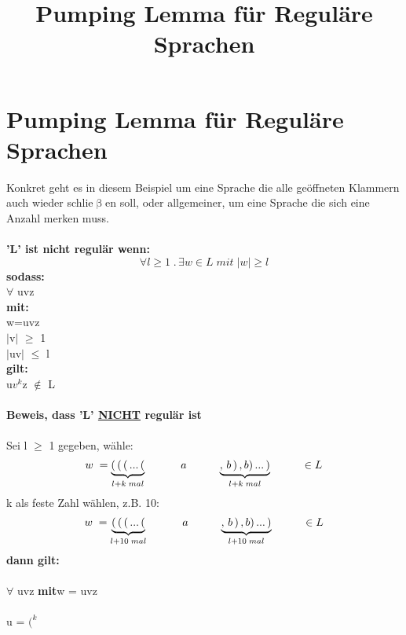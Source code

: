 \documentclass{article}
\title{Pumping Lemma f\"ur Regul\"are Sprachen}
\date{ }
\newcommand{\xhspace}[0]{\noindent\hspace*{5mm}}
\begin{document}
	\section*{Pumping Lemma f\"ur Regul\"are Sprachen}
	Konkret geht es in diesem Beispiel um eine Sprache die alle ge\"offneten Klammern auch wieder schlie$\upbeta$en soll, oder allgemeiner, um eine Sprache die sich eine Anzahl merken muss.\\\\	
	\textbf{'L' ist nicht regul\"ar wenn:}
		\[		
			\forall l \geq 1\;.\, \exists w \in L\;mit\; |w|\geq l
		\]
	\textbf{sodass:}\\
		\xhspace	$\forall$ uvz \\
	\textbf{mit:}\\ 
		\xhspace	w=uvz\\
		\xhspace	$|$v$|$ $\geq$ 1\\
		\xhspace	$|$uv$|$ $\leq$ l\\
	\textbf{gilt:}\\
		\xhspace	u$v^{k}$z $\notin$ L \\ \\
	\textbf{Beweis, dass 'L' \underline{NICHT} regul\"ar ist}\\\\
		Sei l $\geq$ 1 gegeben, w\"ahle:
		\[ 
			w\;= 
				\underbrace{(\,(\,(\,...\,(}_{l+k\;mal}
				\hspace{10mm}
				\;a
				\hspace{1cm}
				\underbrace{,\,b\,)\,,b)\,...\,)}_{l+k\;mal}
				\hspace{10mm}
				\in L
		\]
		k als feste Zahl w\"ahlen, z.B. 10:
		\[ 
			w\;= 
				\underbrace{(\,(\,(\,...\,(}_{l+10\;mal}
				\hspace{10mm}
				\;a
				\hspace{1cm}
				\underbrace{,\,b\,)\,,b)\,...\,)}_{l+10\;mal}
				\hspace{10mm}
				\in L
		\]
		\textbf{dann gilt:}\\\\
		\noindent \hspace*{1cm}$\forall$ uvz \hspace{5mm}\textbf{mit}\hspace{5mm}w = uvz
		\\\\
		\noindent \hspace*{1cm}u = $(^k$ \\ \\
\end{document}
